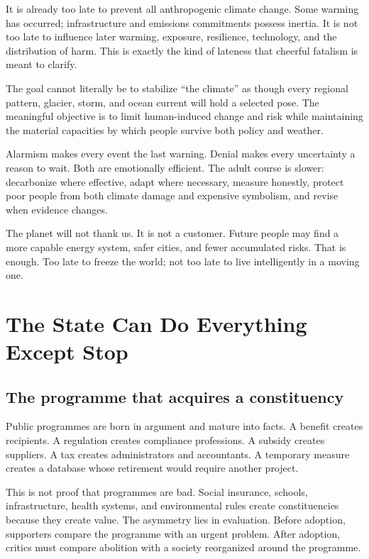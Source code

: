 \documentclass[12pt,a4paper]{book}
\begin{document}
It is already too late to prevent all anthropogenic climate change.  Some
warming has occurred; infrastructure and emissions commitments possess inertia.
It is not too late to influence later warming, exposure, resilience, technology,
and the distribution of harm.  This is exactly the kind of lateness that
cheerful fatalism is meant to clarify.

The goal cannot literally be to stabilize ``the climate'' as though every
regional pattern, glacier, storm, and ocean current will hold a selected pose.
The meaningful objective is to limit human-induced change and risk while
maintaining the material capacities by which people survive both policy and
weather.

Alarmism makes every event the last warning.  Denial makes every uncertainty a
reason to wait.  Both are emotionally efficient.  The adult course is slower:
decarbonize where effective, adapt where necessary, measure honestly, protect
poor people from both climate damage and expensive symbolism, and revise when
evidence changes.

The planet will not thank us.  It is not a customer.  Future people may find a
more capable energy system, safer cities, and fewer accumulated risks.  That is
enough.  Too late to freeze the world; not too late to live intelligently in a
moving one.

\chapter{The State Can Do Everything Except Stop}
\label{chap:state-cannot-stop}

\section{The programme that acquires a constituency}

Public programmes are born in argument and mature into facts.  A benefit
creates recipients.  A regulation creates compliance professions.  A subsidy
creates suppliers.  A tax creates administrators and accountants.  A temporary
measure creates a database whose retirement would require another project.

This is not proof that programmes are bad.  Social insurance, schools,
infrastructure, health systems, and environmental rules create constituencies
because they create value.  The asymmetry lies in evaluation.  Before adoption,
supporters compare the programme with an urgent problem.  After adoption,
critics must compare abolition with a society reorganized around the programme.
\end{document}
